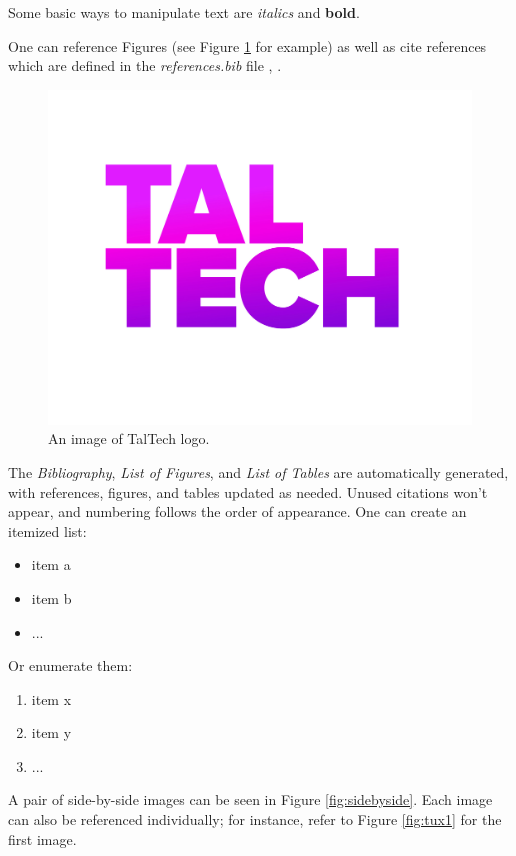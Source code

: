 Some basic ways to manipulate text are \textit{italics} and \textbf{bold}. 

One can reference Figures (see Figure \ref{fig:taltech} for example) as well as cite references which are defined in the \textit{references.bib} file \cite{spectre}, \cite{example-reference} .

\begin{figure}[hb] %
    \centering
    \includegraphics[width=.3\textwidth]{figures/taltech.jpg} %
    \caption{An image of TalTech logo.} %
    \label{fig:taltech} %
\end{figure}

The \textit{Bibliography}, \textit{List of Figures}, and \textit{List of Tables} are automatically\cite{prittSatelliteImageClassification2017} generated\cite{prittSatelliteImageClassification2017}, with references, figures, and tables updated as needed\cite{prittSatelliteImageClassification2017}. Unused citations won't appear, and numbering follows the order of appearance.
One can create an itemized list:
\begin{itemize}  %
    \item item a  %
    \item item b  %
    \item ...
\end{itemize}

Or enumerate them:
\begin{enumerate} %
    \item item x  %
    \item item y
    \item ...
\end{enumerate}


A pair of side-by-side images can be seen in Figure \ref{fig:sidebyside}. Each image can also be referenced individually; for instance, refer to Figure \ref{fig:tux1} for the first image.


